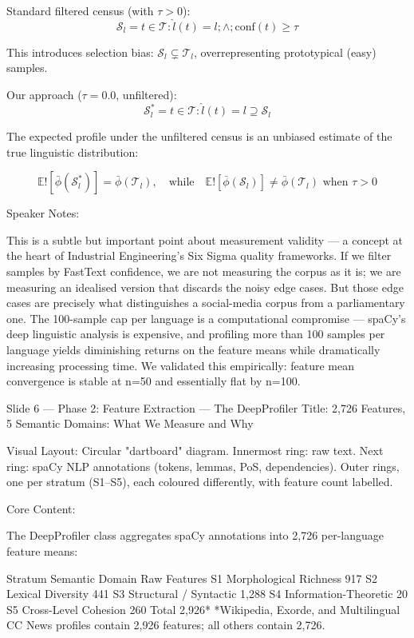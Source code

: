Standard filtered census (with $\tau > 0$):
$$\mathcal{S}_l = { t \in \mathcal{T} : \hat{l}(t) = l ;\wedge; \text{conf}(t) \geq \tau }$$

This introduces selection bias: $\mathcal{S}_l \subsetneq \mathcal{T}_l$, overrepresenting prototypical (easy) samples.

Our approach ($\tau = 0.0$, unfiltered):
$$\mathcal{S}_l^* = { t \in \mathcal{T} : \hat{l}(t) = l } \supseteq \mathcal{S}_l$$

The expected profile under the unfiltered census is an unbiased estimate of the true linguistic distribution:

$$\mathbb{E}!\left[\bar{\phi}(\mathcal{S}_l^*)\right] = \bar{\phi}(\mathcal{T}_l), \quad \text{while} \quad \mathbb{E}!\left[\bar{\phi}(\mathcal{S}_l)\right] \neq \bar{\phi}(\mathcal{T}_l) \text{ when } \tau > 0$$

Speaker Notes:

This is a subtle but important point about measurement validity — a concept at the heart of Industrial Engineering's Six Sigma quality frameworks. If we filter samples by FastText confidence, we are not measuring the corpus as it is; we are measuring an idealised version that discards the noisy edge cases. But those edge cases are precisely what distinguishes a social-media corpus from a parliamentary one. The 100-sample cap per language is a computational compromise — spaCy's deep linguistic analysis is expensive, and profiling more than 100 samples per language yields diminishing returns on the feature means while dramatically increasing processing time. We validated this empirically: feature mean convergence is stable at n=50 and essentially flat by n=100.

Slide 6 — Phase 2: Feature Extraction — The DeepProfiler
Title: 2,726 Features, 5 Semantic Domains: What We Measure and Why

Visual Layout: Circular "dartboard" diagram. Innermost ring: raw text. Next ring: spaCy NLP annotations (tokens, lemmas, PoS, dependencies). Outer rings, one per stratum (S1–S5), each coloured differently, with feature count labelled.

Core Content:

The DeepProfiler class aggregates spaCy annotations into 2,726 per-language feature means:

Stratum	Semantic Domain	Raw Features
S1	Morphological Richness	917
S2	Lexical Diversity	441
S3	Structural / Syntactic	1,288
S4	Information-Theoretic	20
S5	Cross-Level Cohesion	260
Total		2,926*
*Wikipedia, Exorde, and Multilingual CC News profiles contain 2,926 features; all others contain 2,726.

